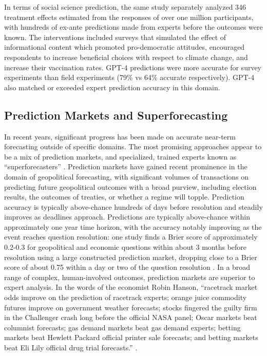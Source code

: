 \documentclass[12pt,a4paper]{article}
\begin{document}
In terms of social science prediction, the same study separately analyzed 346 treatment effects estimated from the responses of over one million participants, with hundreds of ex-ante predictions made from experts before the outcomes were known. The interventions included surveys that simulated the effect of informational content which promoted pro-democratic attitudes, encouraged respondents to increase beneficial choices with respect to climate change, and increase their vaccination rates. GPT-4 predictions were more accurate for survey experiments than field experiments (79\% vs 64\% accurate respectively). GPT-4 also matched or exceeded expert prediction accuracy in this domain.

\subsection{Prediction Markets and Superforecasting}
In recent years, significant progress has been made on accurate near-term forecasting outside of specific domains. The most promising approaches appear to be a mix of prediction markets, and specialized, trained experts known as ``superforecasters'' . Prediction markets have gained recent prominence in the domain of geopolitical forecasting, with significant volumes of transactions on predicting future geopolitical outcomes with a broad purview, including election results, the outcomes of treaties, or whether a regime will topple. Prediction accuracy is typically above-chance hundreds of days before resolution and steadily improves as deadlines approach. Predictions are typically above-chance within approximately one year time horizon, with the accuracy notably improving as the event reaches question resolution: one study finds a Brier score of approximately 0.2-0.3 for geopolitical and economic questions within about 3 months before resolution using a large constructed prediction market, dropping close to a Brier score of about 0.75 within a day or two of the question resolution .  In a broad range of complex, human-involved outcomes, prediction markets are superior to expert analysis. In the words of the economist Robin Hanson, ``racetrack market odds improve on the prediction of racetrack  experts; orange juice commodity futures improve on government weather forecasts;  stocks fingered the guilty firm in the Challenger crash long before the official NASA  panel; Oscar markets beat columnist forecasts; gas demand markets beat gas  demand experts; betting markets beat Hewlett Packard official printer sale  forecasts; and betting markets beat Eli Lily official drug trial forecasts.''  . 
\end{document}
